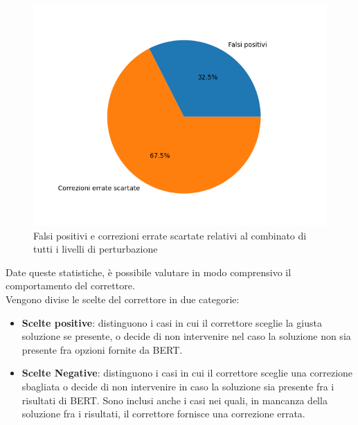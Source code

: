 \documentclass[12pt]{article}
\begin{document}
\begin{figure}[H]
\centering
\includegraphics[width=\textwidth,trim={0 1.5cm 0 1.5cm},clip]{distributions/non_correct_combinato}
\caption{Falsi positivi e correzioni errate scartate relativi al combinato di tutti i livelli di perturbazione}
\label{fig:falsi_pos}
\end{figure}

Date queste statistiche, è possibile valutare in modo comprensivo il comportamento del correttore.\\
Vengono divise le scelte del correttore in due categorie:
\begin{itemize}
\item \textbf{Scelte positive}: distinguono i casi in cui il correttore sceglie la giusta soluzione se presente, o decide di non intervenire nel caso la soluzione non sia presente fra opzioni fornite da BERT.
\item \textbf{Scelte Negative}: distinguono i casi in cui il correttore sceglie una correzione sbagliata o decide di non intervenire in caso la soluzione sia presente fra i risultati di BERT. Sono inclusi anche i casi nei quali, in mancanza della soluzione fra i risultati, il correttore fornisce una correzione errata.
\end{itemize}
\end{document}
